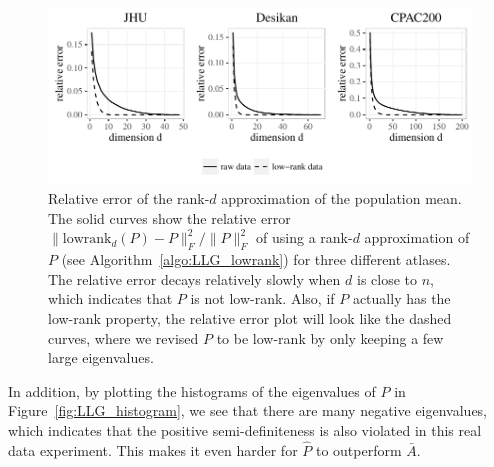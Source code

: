\begin{figure}
\centering
\includegraphics[width=.6\textheight]{./Figures/screeplot_ratio_all.pdf} 
\caption[Relative error of the low-rank approximation of the population mean]{Relative error of the rank-$d$ approximation of the population mean.
The solid curves show the relative error $\|\mathrm{lowrank}_d(P)-P\|_F^2/\|P\|_F^2$ of using a rank-$d$ approximation of $P$ (see Algorithm~\ref{algo:LLG_lowrank}) for three different atlases.
The relative error decays relatively slowly when $d$ is close to $n$, which indicates that $P$ is not low-rank.
Also, if $P$ actually has the low-rank property, the relative error plot will look like the dashed curves, where we revised $P$ to be low-rank by only keeping a few large eigenvalues. }
\label{fig:LLG_screeplot}
\end{figure}

In addition, by plotting the histograms of the eigenvalues of $P$ in Figure~\ref{fig:LLG_histogram}, we see that there are many negative eigenvalues, which indicates that the positive semi-definiteness is also violated in this real data experiment. This makes it even harder for $\hat{P}$ to outperform $\bar{A}$. 

